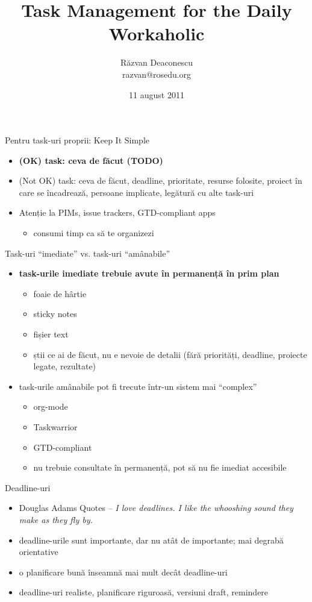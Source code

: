 \documentclass{beamer}
\title[Task Management]{Task Management for the Daily Workaholic}
\institute{Întâlnirile lunare RLUG -- August 2011}
\author[Răzvan Deaconescu]{Răzvan Deaconescu \\
    razvan@rosedu.org}
\date{11 august 2011}
\begin{document}
\frame{\titlepage}

\begin{frame}{Pentru task-uri proprii: Keep It Simple}
  \begin{itemize}
    \item \textbf{(OK) task: ceva de făcut (TODO)}
    \item (Not OK) task: ceva de făcut, deadline, prioritate, resurse folosite,
    proiect în care se încadrează, persoane implicate, legătură cu alte task-uri
    \item Atenție la PIMs, issue trackers, GTD-compliant apps
      \begin{itemize}
        \item consumi timp ca să te organizezi
      \end{itemize}
  \end{itemize}
\end{frame}

\begin{frame}{Task-uri ``imediate'' vs. task-uri ``amânabile''}
  \begin{itemize}
    \item \textbf{task-urile imediate trebuie avute în permanență în prim plan}
      \begin{itemize}
        \item foaie de hârtie
        \item sticky notes
        \item fișier text
        \item știi ce ai de făcut, nu e nevoie de detalii (fără priorități,
        deadline, proiecte legate, rezultate)
      \end{itemize}
    \item task-urile amânabile pot fi trecute într-un sistem mai ``complex''
      \begin{itemize}
        \item org-mode
        \item Taskwarrior
        \item GTD-compliant
        \item nu trebuie consultate în permanență, pot să nu fie imediat
        accesibile
      \end{itemize}
  \end{itemize}
\end{frame}

\begin{frame}{Deadline-uri}
  \begin{itemize}
    \item Douglas Adams Quotes -- \textit{I love deadlines. I like the
    whooshing sound they make as they fly by.}
    \item deadline-urile sunt importante, dar nu atât de importante; mai
    degrabă orientative
    \item o planificare bună înseamnă mai mult decât deadline-uri
    \item deadline-uri realiste, planificare riguroasă, versiuni draft,
    remindere
  \end{itemize}
\end{frame}
\end{document}
